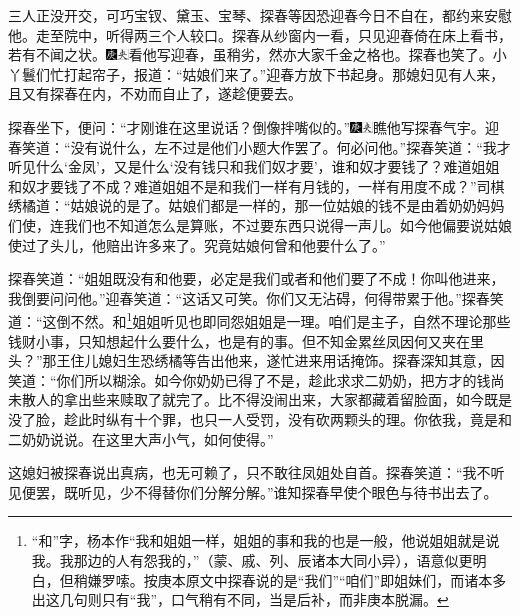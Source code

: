 三人正没开交，可巧宝钗、黛玉、宝琴、探春等因恐迎春今日不自在，都约来安慰他。走至院中，听得两三个人较口。探春从纱窗内一看，只见迎春倚在床上看书，若有不闻之状。{\includegraphics[width=3mm]{../Images/00004}\includegraphics[width=3mm]{../Images/00012}\footnotesize \kaishu 看他写迎春，虽稍劣，然亦大家千金之格也。}探春也笑了。小丫鬟们忙打起帘子，报道：“姑娘们来了。”迎春方放下书起身。那媳妇见有人来，且又有探春在内，不劝而自止了，遂趁便要去。

探春坐下，便问：“才刚谁在这里说话？倒像拌嘴似的。”{\includegraphics[width=3mm]{../Images/00004}\includegraphics[width=3mm]{../Images/00012}\footnotesize \kaishu 瞧他写探春气宇。}迎春笑道：“没有说什么，左不过是他们小题大作罢了。何必问他。”探春笑道：“我才听见什么‘金凤’，又是什么‘没有钱只和我们奴才要’，谁和奴才要钱了？难道姐姐和奴才要钱了不成？难道姐姐不是和我们一样有月钱的，一样有用度不成？”司棋绣橘道：“姑娘说的是了。姑娘们都是一样的，那一位姑娘的钱不是由着奶奶妈妈们使，连我们也不知道怎么是算账，不过要东西只说得一声儿。如今他偏要说姑娘使过了头儿，他赔出许多来了。究竟姑娘何曾和他要什么了。”

探春笑道：“姐姐既没有和他要，必定是我们或者和他们要了不成！你叫他进来，我倒要问问他。”迎春笑道：“这话又可笑。你们又无沾碍，何得带累于他。”探春笑道：“这倒不然。和\footnote{“和”字，杨本作“我和姐姐一样，姐姐的事和我的也是一般，他说姐姐就是说我。我那边的人有怨我的，”（蒙、戚、列、辰诸本大同小异），语意似更明白，但稍嫌罗嗦。按庚本原文中探春说的是“我们”“咱们”即姐妹们，而诸本多出这几句则只有“我”，口气稍有不同，当是后补，而非庚本脱漏。}姐姐听见也即同怨姐姐是一理。咱们是主子，自然不理论那些钱财小事，只知想起什么要什么，也是有的事。但不知金累丝凤因何又夹在里头？”那王住儿媳妇生恐绣橘等告出他来，遂忙进来用话掩饰。探春深知其意，因笑道：“你们所以糊涂。如今你奶奶已得了不是，趁此求求二奶奶，把方才的钱尚未散人的拿出些来赎取了就完了。比不得没闹出来，大家都藏着留脸面，如今既是没了脸，趁此时纵有十个罪，也只一人受罚，没有砍两颗头的理。你依我，竟是和二奶奶说说。在这里大声小气，如何使得。”

这媳妇被探春说出真病，也无可赖了，只不敢往凤姐处自首。探春笑道：“我不听见便罢，既听见，少不得替你们分解分解。”谁知探春早使个眼色与待书出去了。

